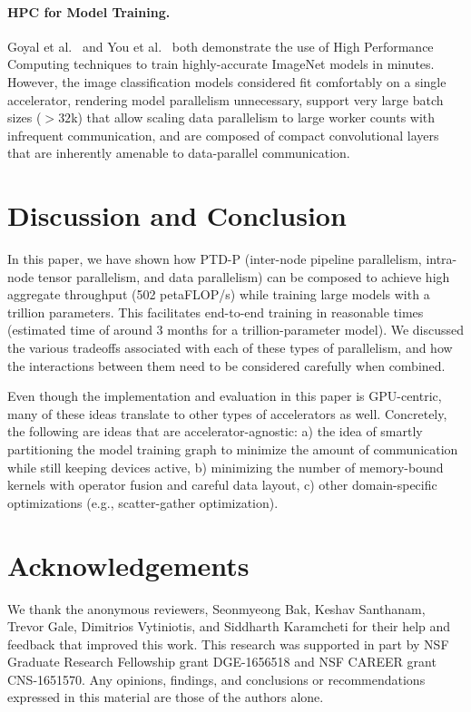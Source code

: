 \documentclass[sigconf,nonacm]{acmart}
\begin{document}
\paragraph{HPC for Model Training.} Goyal et al.~\cite{goyal2017accurate} and You et al.~\cite{you2018imagenet} both demonstrate the use of High Performance Computing techniques to train highly-accurate ImageNet models in minutes. However, the image classification models considered fit comfortably on a single accelerator, rendering model parallelism unnecessary, support very large batch sizes ($>32$k) that allow scaling data parallelism to large worker counts with infrequent communication, and are composed of compact convolutional layers that are inherently amenable to data-parallel communication.

\section{Discussion and Conclusion}

In this paper, we have shown how PTD-P (inter-node pipeline parallelism, intra-node tensor parallelism, and data parallelism) can be composed to achieve high aggregate throughput (502 petaFLOP/s) while training large models with a trillion parameters. This facilitates end-to-end training in reasonable times (estimated time of around 3 months for a trillion-parameter model). We discussed the various tradeoffs associated with each of these types of parallelism, and how the interactions between them need to be considered carefully when combined.

Even though the implementation and evaluation in this paper is GPU-centric, many of these ideas translate to other types of accelerators as well. Concretely, the following are ideas that are accelerator-agnostic: a) the idea of smartly partitioning the model training graph to minimize the amount of communication while still keeping devices active, b) minimizing the number of memory-bound kernels with operator fusion and careful data layout, c) other domain-specific optimizations (e.g., scatter-gather optimization).
\section*{Acknowledgements}

We thank the anonymous reviewers, Seonmyeong Bak, Keshav Santhanam, Trevor
Gale, Dimitrios Vytiniotis, and Siddharth Karamcheti for their help and feedback
that improved this work. This research was supported in part by NSF Graduate
Research Fellowship grant DGE-1656518 and NSF CAREER grant CNS-1651570. Any
opinions, findings, and conclusions or recommendations expressed in this material
are those of the authors alone.
\appendix
\end{document}
